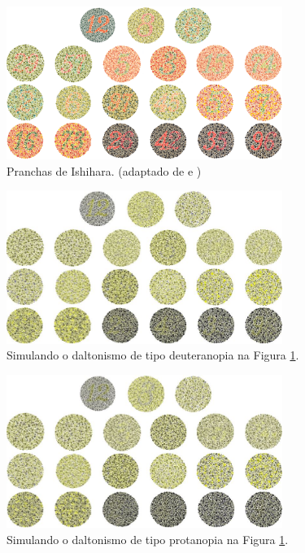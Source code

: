 \documentclass[	12pt, Times, openright, twoside, a4paper, english, brazil]{abntex2}
\begin{document}
\begin{figure}[!htb]
\centering \includegraphics[width=0.80\textwidth]{platesIshihara.png}
\caption{Pranchas de Ishihara. (adaptado de  e ) \label{fig:platesIshihara}}
\end{figure}

\begin{figure}[!htb]
\centering \includegraphics[width=0.80\textwidth]{platesIshiharaDeuteranopia.JPG}
\caption{Simulando o daltonismo de tipo deuteranopia na Figura \ref{fig:platesIshihara}.  \label{fig:platesIshiharaDeuteranopia}}
\end{figure}

\begin{figure}[!htb]
\centering \includegraphics[width=0.80\textwidth]{platesIshiharaProtanopia.JPG}
\caption{Simulando o daltonismo de tipo protanopia na Figura \ref{fig:platesIshihara}.  \label{fig:platesIshiharaProtanopia}}
\end{figure}
\end{document}
